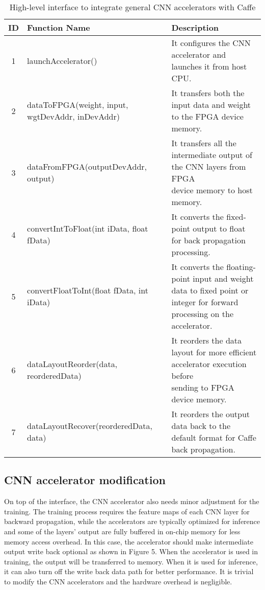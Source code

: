 \begin{table*}
        \centering
        \vspace{-0.3em}
        \caption{High-level interface to integrate general CNN accelerators with Caffe}
        \label{tab:graph}
        \vspace{-0.3em}
        \begin{tabular}{c|l|l}
                \toprule
                ID & Function Name & Description  \\
                \midrule
                1 & launchAccelerator() & It configures the CNN accelerator and launches it from host CPU. \\
		\midrule
                2 & dataToFPGA(weight, input, wgtDevAddr, inDevAddr) & It transfers both the input data and weight to the FPGA device memory. \\
		\midrule
		3 & dataFromFPGA(outputDevAddr, output) & \shortstack[l]{It transfers all the intermediate output of the CNN layers from FPGA \\device memory to host memory.} \\
		\midrule
		4 & convertIntToFloat(int iData, float fData) & It converts the fixed-point output to float for back propagation processing. \\
		\midrule
		5 & convertFloatToInt(float fData,  int iData) & \shortstack[l]{It converts the floating-point input and weight data to fixed point or \\integer for forward processing on the accelerator.} \\
		\midrule
		6 & dataLayoutReorder(data, reorderedData) & \shortstack[l]{It reorders the data layout for more efficient accelerator execution before \\sending to FPGA device memory.} \\
		\midrule
		7 & dataLayoutRecover(reorderedData, data) & It reorders the output data back to the default format for Caffe back propagation. \\
                \bottomrule
        \end{tabular}
        \vspace{-1em}
\end{table*}

\subsection{CNN accelerator modification}
  On top of the interface, the CNN accelerator also needs minor adjustment for the training. 
The training process requires the feature maps of each CNN layer for backward propagation, 
while the accelerators are typically optimized for inference and some of the layers’ output 
are fully buffered in on-chip memory for less memory access overhead. In this case, 
the accelerator should make intermediate output write back optional as shown in Figure 5. 
When the accelerator is used in training, the output will be transferred to memory. 
When it is used for inference, it can also turn off the write back data path for better performance. 
It is trivial to modify the CNN accelerators and the hardware overhead is negligible.

